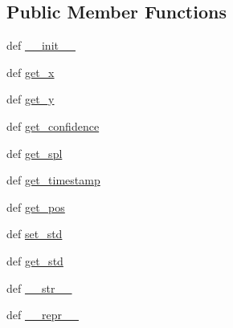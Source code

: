 \subsection*{Public Member Functions}
\begin{DoxyCompactItemize}
\item 
def \hyperlink{classlocaudio_1_1detectionevent_1_1DetectionEvent_aa998c7524a9484b5a3a7f80d4eba2280}{\-\_\-\-\_\-init\-\_\-\-\_\-}
\item 
def \hyperlink{classlocaudio_1_1detectionevent_1_1DetectionEvent_a220bfcacc5815c88912fe5fdc7b7a41c}{get\-\_\-x}
\item 
def \hyperlink{classlocaudio_1_1detectionevent_1_1DetectionEvent_a33b86d111b0979e20894dd7035aafb15}{get\-\_\-y}
\item 
def \hyperlink{classlocaudio_1_1detectionevent_1_1DetectionEvent_ae0e6b0c991471cfaf025d09c8730b45e}{get\-\_\-confidence}
\item 
def \hyperlink{classlocaudio_1_1detectionevent_1_1DetectionEvent_aa71a820d885f97dfb7aad1e32921cc75}{get\-\_\-spl}
\item 
def \hyperlink{classlocaudio_1_1detectionevent_1_1DetectionEvent_ad89f1381403f7cf79a5540b03fcdcdb7}{get\-\_\-timestamp}
\item 
def \hyperlink{classlocaudio_1_1detectionevent_1_1DetectionEvent_a688fd78c2e1ac304d14c216763cd126b}{get\-\_\-pos}
\item 
def \hyperlink{classlocaudio_1_1detectionevent_1_1DetectionEvent_aabfd0a2abada20359af7261316524af8}{set\-\_\-std}
\item 
def \hyperlink{classlocaudio_1_1detectionevent_1_1DetectionEvent_ac95924bfc9fc57513854c81b6bd2bbfc}{get\-\_\-std}
\item 
def \hyperlink{classlocaudio_1_1detectionevent_1_1DetectionEvent_a12aa42b5a222d14aa587e4436d7188e8}{\-\_\-\-\_\-str\-\_\-\-\_\-}
\item 
def \hyperlink{classlocaudio_1_1detectionevent_1_1DetectionEvent_a1d0106284909ce15dded633c6986bfee}{\-\_\-\-\_\-repr\-\_\-\-\_\-}
\end{DoxyCompactItemize}
